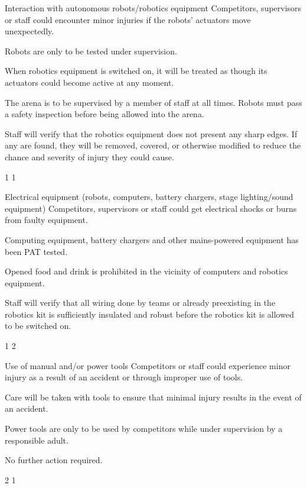 {    \risk
        {Interaction with autonomous robots/robotics equipment}
        {Competitors, supervisors or staff could encounter minor injuries if the
         robots' actuators move unexpectedly.}
        {\item Robots are only to be tested under supervision.
         \item When robotics equipment is switched on, it will be treated as
         though its actuators could become active at any moment.
         \item The arena is to be supervised by a member of staff at all times.
         Robots must pass a safety inspection before being allowed into the
         arena.}
        {\item Staff will verify that the robotics equipment does not present
         any sharp edges. If any are found, they will be removed, covered, or
         otherwise modified to reduce the chance and severity of injury they
         could cause.}
        {1} %
        {1} %

    \risk
        {Electrical equipment (robots, computers, battery chargers, stage
         lighting/sound equipment)}
        {Competitors, supervisors or staff could get electrical shocks or burns
         from faulty equipment.}
        {\item Computing equipment, battery chargers and other mains-powered
         equipment has been PAT tested.
         \item Opened food and drink is prohibited in the vicinity of computers
         and robotics equipment.}
        {\item Staff will verify that all wiring done by teams or already
         preexisting in the robotics kit is sufficiently insulated and robust
         before the robotics kit is allowed to be switched on.}
        {1} %
        {2} %

    \risk
        {Use of manual and/or power tools}
        {Competitors or staff could experience minor injury as a result of an
         accident or through improper use of tools.}
        {\item Care will be taken with tools to ensure that minimal injury
         results in the event of an accident.
         \item Power tools are only to be used by competitors while under
         supervision by a responsible adult.}
        {\item No further action required.}
        {2} %
        {1} %

}
